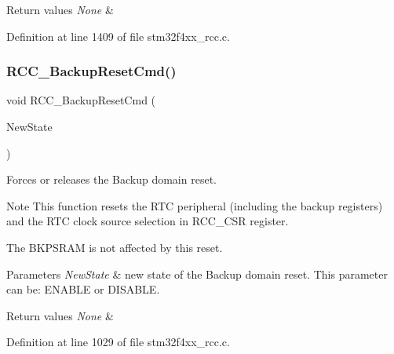 \begin{DoxyRetVals}{Return values}
{\em None} & \\
\hline
\end{DoxyRetVals}


Definition at line 1409 of file stm32f4xx\+\_\+rcc.\+c.

\mbox{\label{group___r_c_c_ga636c3b72f35391e67f12a551b15fa54a}} 
\subsubsection{\texorpdfstring{R\+C\+C\+\_\+\+Backup\+Reset\+Cmd()}{RCC\_BackupResetCmd()}}
{\footnotesize\ttfamily void R\+C\+C\+\_\+\+Backup\+Reset\+Cmd (\begin{DoxyParamCaption}\item[{Functional\+State}]{New\+State }\end{DoxyParamCaption})}



Forces or releases the Backup domain reset. 

\begin{DoxyNote}{Note}
This function resets the R\+TC peripheral (including the backup registers) and the R\+TC clock source selection in R\+C\+C\+\_\+\+C\+SR register. 

The B\+K\+P\+S\+R\+AM is not affected by this reset. 
\end{DoxyNote}

\begin{DoxyParams}{Parameters}
{\em New\+State} & new state of the Backup domain reset. This parameter can be\+: E\+N\+A\+B\+LE or D\+I\+S\+A\+B\+LE. \\
\hline
\end{DoxyParams}

\begin{DoxyRetVals}{Return values}
{\em None} & \\
\hline
\end{DoxyRetVals}


Definition at line 1029 of file stm32f4xx\+\_\+rcc.\+c.

\mbox{\label{group___r_c_c_ga53f909dbb15a54124419084ebda97d72}} 
